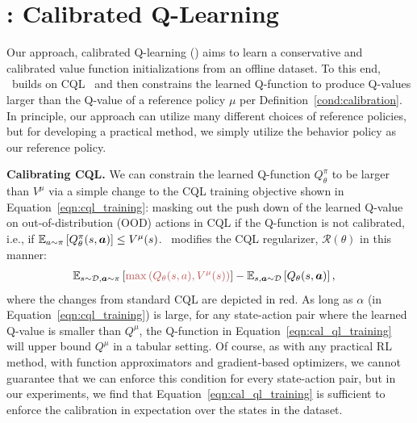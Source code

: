 \vspace{-0.1cm}
\section{\methodname: Calibrated Q-Learning}
\label{sec:empirical-method}
\vspace{-0.25cm}
Our approach, calibrated Q-learning (\methodname) aims to learn a conservative and calibrated value function initializations from an offline dataset. To this end, \methodname\ builds on CQL~\citep{kumar2020conservative} and then constrains the learned Q-function to produce Q-values larger than the Q-value of a reference policy $\mu$ per Definition~\ref{cond:calibration}. In principle, our approach can utilize many different choices of reference policies, but for developing a practical method, we simply utilize the behavior policy as our reference policy.  


\textbf{Calibrating CQL.} We can constrain the learned Q-function $Q^\pi_\theta$ to be larger than $V^\mu$ via a simple change to the CQL training objective shown in Equation~\ref{eqn:cql_training}: masking out the push down of the learned Q-value on out-of-distribution (OOD) actions in CQL if the Q-function is not calibrated, i.e., if $\mathbb{E}_{a \sim \pi}\left[Q^\pi_\theta(s, \boldsymbol{a})\right] \leq V^\mu(s)$. \methodname\ modifies the CQL regularizer, $\mathcal{R}(\theta)$ in this manner: 
\begin{align}
\label{eqn:cal_ql_training}
\!\!\!\!\!\!\mathbb{E}_{\bs \sim \mathcal{D}, \mathbf{a} \sim \pi} \brac{{\color[HTML]{B85450}{\max \left( Q_\theta(s,a), V^\mu(s) \right)}} } - \mathbb{E}_{\bs, \mathbf{a} \sim \mathcal{D}}\left[Q_\theta(\bs,\mathbf{a})\right],
\end{align}
where the changes from standard CQL are depicted in {\color[HTML]{B85450} red}. As long as $\alpha$ (in Equation~\ref{eqn:cql_training}) is large, for any state-action pair where the learned Q-value is smaller than $Q^\mu$, the Q-function in Equation~\ref{eqn:cal_ql_training} will upper bound $Q^\mu$ in a tabular setting. Of course, as with any practical RL method, with function approximators and gradient-based optimizers, we cannot guarantee that we can enforce this condition for every state-action pair, but in our experiments, we find that Equation~\ref{eqn:cal_ql_training} is sufficient to enforce the calibration in expectation over the states in the dataset.         

